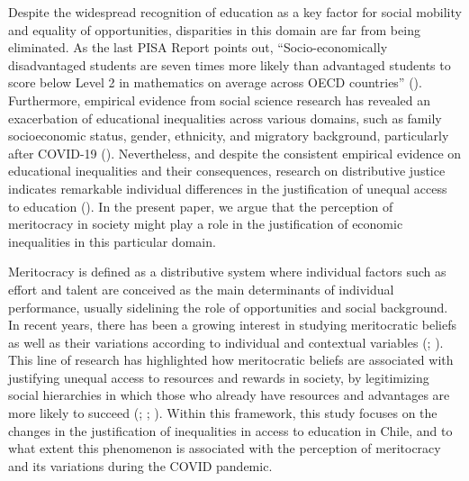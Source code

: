 \documentclass[
  12pt,
  a4paper,
]{article}
\begin{document}
Despite the widespread recognition of education as a key factor for social mobility and equality of opportunities, disparities in this domain are far from being eliminated. As the last PISA Report points out, ``Socio-economically disadvantaged students are seven times more likely than advantaged students to score below Level 2 in mathematics on average across OECD countries'' (). Furthermore, empirical evidence from social science research has revealed an exacerbation of educational inequalities across various domains, such as family socioeconomic status, gender, ethnicity, and migratory background, particularly after COVID-19 (). Nevertheless, and despite the consistent empirical evidence on educational inequalities and their consequences, research on distributive justice indicates remarkable individual differences in the justification of unequal access to education (). In the present paper, we argue that the perception of meritocracy in society might play a role in the justification of economic inequalities in this particular domain.

Meritocracy is defined as a distributive system where individual factors such as effort and talent are conceived as the main determinants of individual performance, usually sidelining the role of opportunities and social background. In recent years, there has been a growing interest in studying meritocratic beliefs as well as their variations according to individual and contextual variables (; ). This line of research has highlighted how meritocratic beliefs are associated with justifying unequal access to resources and rewards in society, by legitimizing social hierarchies in which those who already have resources and advantages are more likely to succeed (; ; ). Within this framework, this study focuses on the changes in the justification of inequalities in access to education in Chile, and to what extent this phenomenon is associated with the perception of meritocracy and its variations during the COVID pandemic.
\end{document}
